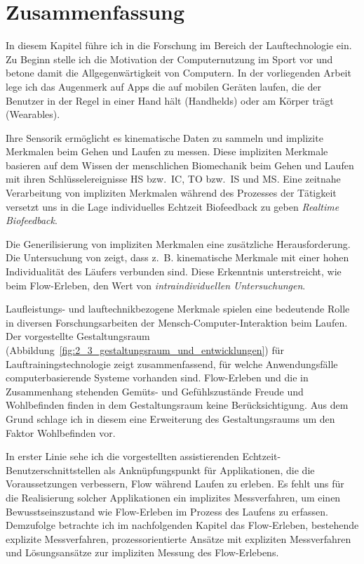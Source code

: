 

\section{Zusammenfassung} 

\label{sec:zusammenfassung_2}

In diesem Kapitel führe ich in die Forschung im Bereich der Lauftechnologie ein. Zu Beginn stelle ich die Motivation der Computernutzung im Sport vor und betone damit die Allgegenwärtigkeit von Computern. In der vorliegenden Arbeit lege ich das Augenmerk auf Apps die auf mobilen Geräten laufen, die der Benutzer in der Regel in einer Hand hält (Handhelds) oder am Körper trägt (Wearables).

Ihre Sensorik ermöglicht es kinematische Daten zu sammeln und implizite Merkmalen beim Gehen und Laufen zu messen. Diese impliziten Merkmale basieren auf dem Wissen der menschlichen Biomechanik beim Gehen und Laufen mit ihren Schlüsselereignisse \ac{HS} bzw.\ \ac{IC}, \ac{TO} bzw.\ \ac{IS} und \ac{MS}. Eine zeitnahe Verarbeitung von impliziten Merkmalen während des Prozesses der Tätigkeit versetzt uns in die Lage individuelles Echtzeit Biofeedback zu geben \emph{Realtime Biofeedback}. 

Die Generilisierung von impliziten Merkmalen eine zusätzliche Herausforderung. Die Untersuchung von \citet{Strohrmann2012} zeigt, dass z.~B. kinematische Merkmale mit einer hohen Individualität des Läufers verbunden sind. Diese Erkenntnis unterstreicht, wie beim Flow-Erleben, den Wert von \emph{intraindividuellen Untersuchungen}.

Laufleistungs- und lauftechnikbezogene Merkmale spielen eine bedeutende Rolle in diversen Forschungsarbeiten der Mensch-Computer-Interaktion beim Laufen. Der vorgestellte Gestaltungsraum (Abbildung~\ref{fig:2_3_gestaltungsraum_und_entwicklungen}) für Lauftrainingstechnologie zeigt zusammenfassend, für welche Anwendungsfälle computerbasierende Systeme vorhanden sind. Flow-Erleben und die in Zusammenhang stehenden Gemüts- und Gefühlszustände Freude und Wohlbefinden finden in dem Gestaltungsraum keine Berücksichtigung. Aus dem Grund schlage ich in diesem eine Erweiterung des Gestaltungsraums um den Faktor Wohlbefinden vor.

In erster Linie sehe ich die vorgestellten assistierenden Echtzeit-Benutzerschnittstellen als Anknüpfungspunkt für Applikationen, die die Voraussetzungen verbessern, Flow während Laufen zu erleben. Es fehlt uns für die Realisierung solcher Applikationen ein implizites Messverfahren, um einen Bewusstseinszustand wie Flow-Erleben im Prozess des Laufens zu erfassen. Demzufolge betrachte ich im nachfolgenden Kapitel das Flow-Erleben, bestehende explizite Messverfahren, prozessorientierte Ansätze mit expliziten Messverfahren und Lösungsansätze zur impliziten Messung des Flow-Erlebens.

